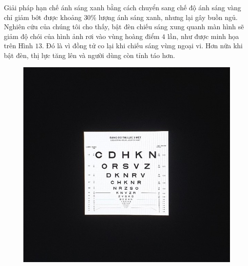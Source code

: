 \begin{multicols}{2}
	\vskip 0.1cm
	Giải pháp hạn chế ánh sáng xanh bằng cách chuyển sang chế độ ánh sáng vàng chỉ giảm bớt được khoảng $30\%$ lượng ánh sáng xanh, nhưng lại gây buồn ngủ. 
	\vskip 0.1cm
	Nghiên cứu của chúng tôi cho thấy, bật đèn chiếu sáng xung quanh màn hình sẽ giảm độ chói của hình ảnh rơi vào vùng hoàng điểm $4$ lần, như được minh họa trên Hình $13$. Đó là vì đồng tử co lại khi chiếu sáng vùng ngoại vi. Hơn nữa khi bật đèn, thị lực tăng lên và người dùng còn tỉnh táo hơn.
	\begin{figure}[H]
		\vspace*{-5pt}
		\centering
		\captionsetup{labelformat= empty, justification=centering}
		\includegraphics[width= 1\linewidth]{13a}
		

\end{figure}
\end{multicols}
